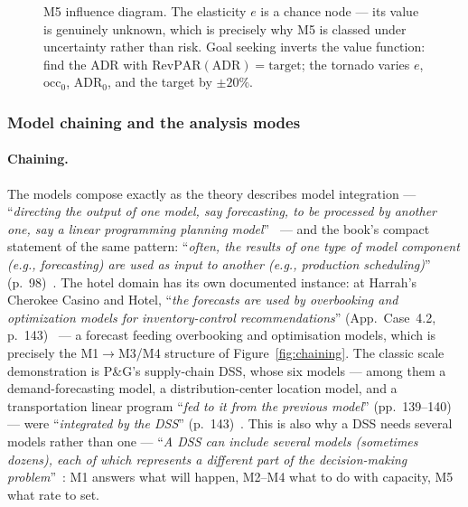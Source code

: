 \begin{figure}[H]
\centering
{}
\caption{M5 influence diagram. The elasticity $e$ is a chance node --- its value is genuinely unknown, which is precisely why M5 is classed under uncertainty rather than risk. Goal seeking inverts the value function: find the $\mathrm{ADR}$ with $\mathrm{RevPAR}(\mathrm{ADR}) = \text{target}$; the tornado varies $e$, $\mathrm{occ}_0$, $\mathrm{ADR}_0$, and the target by $\pm 20\%$.}
\label{fig:id-m5}
\end{figure}

\subsubsection{Model chaining and the analysis modes}

\paragraph{Chaining.}
The models compose exactly as the theory describes model integration --- ``\emph{directing the output of one model, say forecasting, to be processed by another one, say a linear programming planning model}''~\cite{turban2011} --- and the book's compact statement of the same pattern: ``\emph{often, the results of one type of model component (e.g., forecasting) are used as input to another (e.g., production scheduling)}'' (p.~98)~\cite{turban2011}. The hotel domain has its own documented instance: at Harrah's Cherokee Casino and Hotel, ``\emph{the forecasts are used by overbooking and optimization models for inventory-control recommendations}'' (App.~Case~4.2, p.~143)~\cite{turban2011} --- a forecast feeding overbooking and optimisation models, which is precisely the M1$\to$M3/M4 structure of Figure~\ref{fig:chaining}. The classic scale demonstration is P\&G's supply-chain DSS, whose six models --- among them a demand-forecasting model, a distribution-center location model, and a transportation linear program ``\emph{fed to it from the previous model}'' (pp.~139--140) --- were ``\emph{integrated by the DSS}'' (p.~143)~\cite{turban2011}. This is also why a DSS needs several models rather than one --- ``\emph{A DSS can include several models (sometimes dozens), each of which represents a different part of the decision-making problem}''~\cite{turban2011}: M1 answers what will happen, M2--M4 what to do with capacity, M5 what rate to set.

